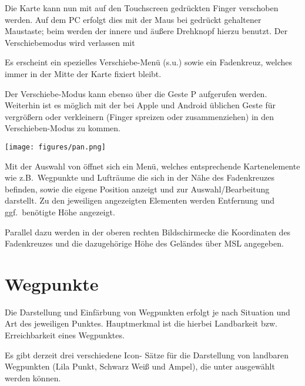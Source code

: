 Die Karte kann nun mit auf den Touchscreen gedrückten Finger verschoben werden. Auf dem \textsf{PC}  erfolgt dies mit der Maus bei gedrückt gehaltener Maustaste; beim \al werden der innere und äußere Drehknopf hierzu benutzt. Der Verschiebemodus wird verlassen mit 

Es erscheint ein spezielles Verschiebe-Menü (s.u.) sowie ein Fadenkreuz, welches immer in der Mitte der Karte fixiert bleibt.

Der Verschiebe-Modus kann ebenso über die Geste P  aufgerufen werden. Weiterhin ist es möglich mit der bei Apple und Android üblichen Geste 
für vergrößern oder verkleinern (Finger spreizen oder zusammenziehen) in den Verschieben-Modus  zu kommen.

\begin{center}\texttt{[image: figures/pan.png]}
\end{center}
Mit der Auswahl von  öffnet sich ein Menü, welches entsprechende Kartenelemente wie z.B.\ Wegpunkte und Lufträume die sich in der Nähe des Fadenkreuzes befinden, sowie die eigene Position anzeigt und zur Auswahl/Bearbeitung darstellt. Zu den jeweiligen angezeigten Elementen werden Entfernung und ggf.\ benötigte Höhe angezeigt.

Parallel dazu werden in der oberen rechten Bildschirmecke die Koordinaten des Fadenkreuzes und die dazugehörige Höhe des Geländes über MSL angegeben.  

\section{Wegpunkte} \label{sec:waypoint-schemes}
Die Darstellung und Einfärbung von Wegpunkten erfolgt je nach Situation und Art des jeweiligen Punktes. Hauptmerkmal ist die hierbei Landbarkeit bzw. Erreichbarkeit eines Wegpunktes.

Es gibt derzeit drei verschiedene Icon- Sätze  für die Darstellung von landbaren Wegpunkten  (Lila Punkt, Schwarz Weiß und Ampel), die unter 
 ausgewählt werden können.

